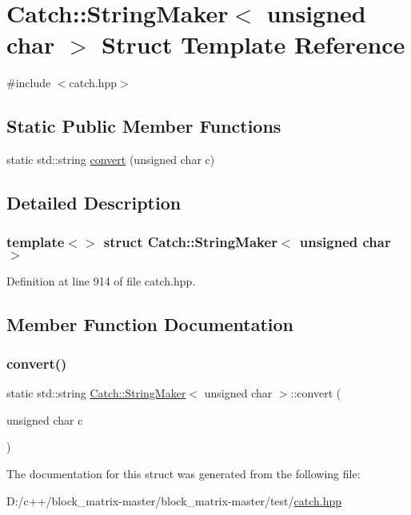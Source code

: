 \hypertarget{struct_catch_1_1_string_maker_3_01unsigned_01char_01_4}{}\section{Catch\+:\+:String\+Maker$<$ unsigned char $>$ Struct Template Reference}
\label{struct_catch_1_1_string_maker_3_01unsigned_01char_01_4}


{\ttfamily \#include $<$catch.\+hpp$>$}

\subsection*{Static Public Member Functions}
\begin{DoxyCompactItemize}
\item 
static std\+::string \mbox{\hyperlink{struct_catch_1_1_string_maker_3_01unsigned_01char_01_4_a7cddb1df26275b9a8e631466eb122f59}{convert}} (unsigned char c)
\end{DoxyCompactItemize}


\subsection{Detailed Description}
\subsubsection*{template$<$$>$\newline
struct Catch\+::\+String\+Maker$<$ unsigned char $>$}



Definition at line 914 of file catch.\+hpp.



\subsection{Member Function Documentation}
\mbox{\label{struct_catch_1_1_string_maker_3_01unsigned_01char_01_4_a7cddb1df26275b9a8e631466eb122f59}} 
\subsubsection{\texorpdfstring{convert()}{convert()}}
{\footnotesize\ttfamily static std\+::string \mbox{\hyperlink{struct_catch_1_1_string_maker}{Catch\+::\+String\+Maker}}$<$ unsigned char $>$\+::convert (\begin{DoxyParamCaption}\item[{unsigned char}]{c }\end{DoxyParamCaption})\hspace{0.3cm}{\ttfamily [static]}}



The documentation for this struct was generated from the following file\+:\begin{DoxyCompactItemize}
\item 
D\+:/c++/block\+\_\+matrix-\/master/block\+\_\+matrix-\/master/test/\mbox{\hyperlink{catch_8hpp}{catch.\+hpp}}\end{DoxyCompactItemize}
